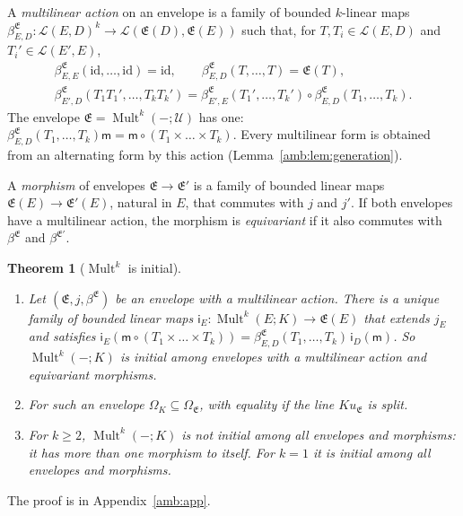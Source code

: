 \documentclass[11pt]{amsart}
\newtheorem{theorem}{Theorem}[section]
\theoremstyle{definition}
\theoremstyle{remark}
\numberwithin{equation}{section}
\newcommand{\cL}{\mathcal L}
\newcommand{\Mult}{\operatorname{Mult}}
\newcommand{\id}{\mathrm{id}}
\theoremstyle{plain}
\theoremstyle{definition}
\theoremstyle{plain}
\begin{document}
A \emph{multilinear action} on an envelope is a family of bounded $k$-linear maps $\beta^{\mathfrak E}_{E,D}\colon\cL(E,D)^k\to\cL(\mathfrak E(D),\mathfrak E(E))$ such that, for $T,T_i\in\cL(E,D)$ and $T_i'\in\cL(E',E)$,
\begin{equation}\label{amb:c:action}
\begin{gathered}
 \beta^{\mathfrak E}_{E,E}(\id,\dots,\id)=\id,\qquad\beta^{\mathfrak E}_{E,D}(T,\dots,T)=\mathfrak E(T),\\
 \beta^{\mathfrak E}_{E',D}(T_1T_1',\dots,T_kT_k')=\beta^{\mathfrak E}_{E',E}(T_1',\dots,T_k')\circ\beta^{\mathfrak E}_{E,D}(T_1,\dots,T_k).
\end{gathered}
\end{equation}
The envelope $\mathfrak E=\Mult^k(-;\mathcal U)$ has one: $\beta^{\mathfrak E}_{E,D}(T_1,\dots,T_k)\mathsf m=\mathsf m\circ(T_1\times\dots\times T_k)$. Every multilinear form is obtained from an alternating form by this action (Lemma~\ref{amb:lem:generation}).

A \emph{morphism} of envelopes $\mathfrak E\to\mathfrak E'$ is a family of bounded linear maps $\mathfrak E(E)\to\mathfrak E'(E)$, natural in $E$, that commutes with $j$ and $j'$. If both envelopes have a multilinear action, the morphism is \emph{equivariant} if it also commutes with $\beta^{\mathfrak E}$ and $\beta^{\mathfrak E'}$.

\begin{theorem}[$\Mult^k$ is initial]\label{amb:thm:initial}
\begin{enumerate}
\item Let $(\mathfrak E,j,\beta^{\mathfrak E})$ be an envelope with a multilinear action. There is a unique family of bounded linear maps $\mathsf i_E\colon\Mult^k(E;K)\to\mathfrak E(E)$ that extends $j_E$ and satisfies $\mathsf i_E(\mathsf m\circ(T_1\times\dots\times T_k))=\beta^{\mathfrak E}_{E,D}(T_1,\dots,T_k)\,\mathsf i_D(\mathsf m)$. So $\Mult^k(-;K)$ is initial among envelopes with a multilinear action and equivariant morphisms.
\item For such an envelope $\Omega_K\subseteq\Omega_{\mathfrak E}$, with equality if the line $Ku_{\mathfrak E}$ is split.
\item For $k\ge2$, $\Mult^k(-;K)$ is not initial among all envelopes and morphisms: it has more than one morphism to itself. For $k=1$ it is initial among all envelopes and morphisms.
\end{enumerate}
\end{theorem}
The proof is in Appendix~\ref{amb:app}.
\end{document}
